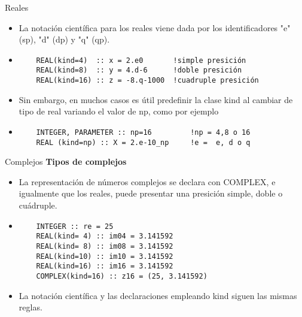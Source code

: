 \begin{frame}[fragile]{Reales}
 \begin{itemize}[<+(0)->]
  \item La notación científica para los reales viene dada por los identificadores "e" (sp), "d" (dp) y "q" (qp).  
  \vspace{0.2cm}
  \item []
   \begin{verbatim}
    REAL(kind=4)  :: x = 2.e0       !simple presición
    REAL(kind=8)  :: y = 4.d-6      !doble presición
    REAL(kind=16) :: z = -8.q-1000  !cuadruple presición
   \end{verbatim}
  \vspace{0.2cm}
   \item Sin embargo, en muchos casos es útil predefinir la clase kind al cambiar de tipo de real variando el valor de np, como por ejemplo 
  \vspace{0.2cm}
  \item []
   \begin{verbatim}
    INTEGER, PARAMETER :: np=16         !np = 4,8 o 16
    REAL (kind=np) :: X = 2.e-10_np     !e =  e, d o q
   \end{verbatim}
 \end{itemize}
\end{frame}


\begin{frame}[fragile]{Complejos}
\textbf{Tipos de complejos}
 \begin{itemize}[<+(1)->]
  \item La representación de números complejos se declara con COMPLEX, e igualmente que los reales, puede presentar una presición simple, doble o cuádruple.
  \vspace{0.2cm}
  \item []
   \begin{verbatim}
    INTEGER :: re = 25
    REAL(kind= 4) :: im04 = 3.141592
    REAL(kind= 8) :: im08 = 3.141592
    REAL(kind=10) :: im10 = 3.141592
    REAL(kind=16) :: im16 = 3.141592
    COMPLEX(kind=16) :: z16 = (25, 3.141592)
   \end{verbatim}
  \item La notación científica y las declaraciones empleando kind siguen las mismas reglas.
 \end{itemize}
\end{frame}